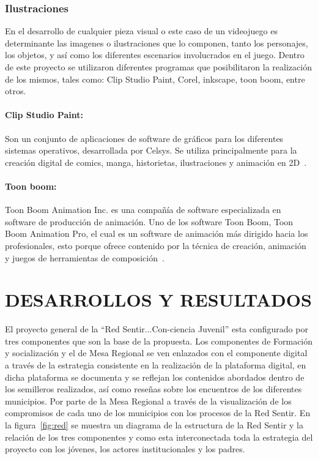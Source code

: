 \documentclass[journal,transmag]{IEEEtran}
\begin{document}
\subsubsection{Ilustraciones}
En el desarrollo de cualquier pieza visual o este caso de un videojuego es determinante las imagenes o ilustraciones que lo componen, tanto los personajes, los objetos, y así como los diferentes escenarios involucrados en el juego. Dentro de este proyecto se utilizaron diferentes programas que posibilitaron la realización de los mismos, tales como: Clip Studio Paint, Corel, inkscape, toon boom, entre otros.

\paragraph{Clip Studio Paint:} Son un conjunto de aplicaciones de software de gráficos para los diferentes sistemas operativos, desarrollada por Celsys. Se utiliza principalmente para la creación digital de comics, manga, historietas, ilustraciones y animación en 2D~\cite{ClipP}.

\paragraph{Toon boom:} Toon Boom Animation Inc. es una compañía de software especializada en software de producción de animación. Uno de los software Toon Boom, Toon Boom Animation Pro, el cual  es un software de animación más dirigido hacia los profesionales, esto porque ofrece contenido por la técnica de creación, animación y juegos de herramientas de composición~\cite{ToonB}. 

\section{DESARROLLOS Y RESULTADOS}\label{sec:resultados}

El proyecto general de la ``Red Sentir...Con-ciencia Juvenil'' esta configurado por tres componentes que son la base de la propuesta. Los componentes de Formación y socialización y el de Mesa Regional se ven enlazados con el componente digital a través de la estrategia consistente en la realización de la plataforma digital, en dicha plataforma se documenta y se reflejan los contenidos abordados dentro de los semilleros realizados, así como reseñas sobre los encuentros de los diferentes municipios. Por parte de la Mesa Regional a través de la visualización de los compromisos de cada uno de los municipios con los procesos de la Red Sentir. En la figura~\ref{fig:red} se muestra un diagrama de la estructura de la Red Sentir y la relación de los tres componentes y como esta interconectada toda la estrategia del proyecto con los jóvenes, los actores institucionales y los padres. 
\end{document}
